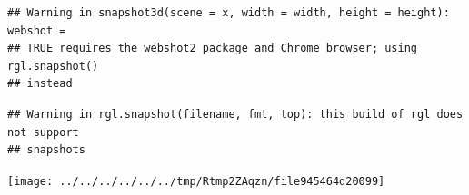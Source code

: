 \documentclass[
]{article}
\newenvironment{Shaded}{\begin{snugshade}}{\end{snugshade}}
\newcommand{\AttributeTok}[1]{\textcolor[rgb]{0.13,0.29,0.53}{#1}}
\newcommand{\CommentTok}[1]{\textcolor[rgb]{0.56,0.35,0.01}{\textit{#1}}}
\newcommand{\ConstantTok}[1]{\textcolor[rgb]{0.56,0.35,0.01}{#1}}
\newcommand{\FunctionTok}[1]{\textcolor[rgb]{0.13,0.29,0.53}{\textbf{#1}}}
\newcommand{\NormalTok}[1]{#1}
\newcommand{\SpecialCharTok}[1]{\textcolor[rgb]{0.81,0.36,0.00}{\textbf{#1}}}
\begin{document}
\begin{Shaded}
\end{Shaded}

\begin{verbatim}
## Warning in snapshot3d(scene = x, width = width, height = height): webshot =
## TRUE requires the webshot2 package and Chrome browser; using rgl.snapshot()
## instead
\end{verbatim}

\begin{verbatim}
## Warning in rgl.snapshot(filename, fmt, top): this build of rgl does not support
## snapshots
\end{verbatim}

\texttt{[image: ../../../../../../tmp/Rtmp2ZAqzn/file945464d20099]}
\end{document}
